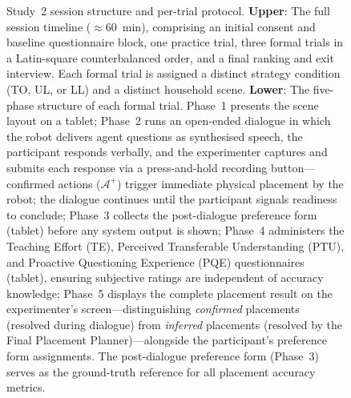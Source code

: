 \documentclass[manuscript,review,anonymous]{acmart}
\begin{document}
\begin{figure}[t]
  \caption{Study~2 session structure and per-trial protocol. \textbf{Upper}: The full session timeline ($\approx$60~min), comprising an initial consent and baseline questionnaire block, one practice trial, three formal trials in a Latin-square counterbalanced order, and a final ranking and exit interview. Each formal trial is assigned a distinct strategy condition (TO, UL, or LL) and a distinct household scene. \textbf{Lower}: The five-phase structure of each formal trial. Phase~1 presents the scene layout on a tablet; Phase~2 runs an open-ended dialogue in which the robot delivers agent questions as synthesised speech, the participant responds verbally, and the experimenter captures and submits each response via a press-and-hold recording button---confirmed actions ($\mathcal{A}^+$) trigger immediate physical placement by the robot; the dialogue continues until the participant signals readiness to conclude; Phase~3 collects the post-dialogue preference form (tablet) before any system output is shown; Phase~4 administers the Teaching Effort (TE), Perceived Transferable Understanding (PTU), and Proactive Questioning Experience (PQE) questionnaires (tablet), ensuring subjective ratings are independent of accuracy knowledge; Phase~5 displays the complete placement result on the experimenter's screen---distinguishing \textit{confirmed} placements (resolved during dialogue) from \textit{inferred} placements (resolved by the Final Placement Planner)---alongside the participant's preference form assignments. The post-dialogue preference form (Phase~3) serves as the ground-truth reference for all placement accuracy metrics.}
  \label{fig:study2-procedure}
\end{figure}
\end{document}
